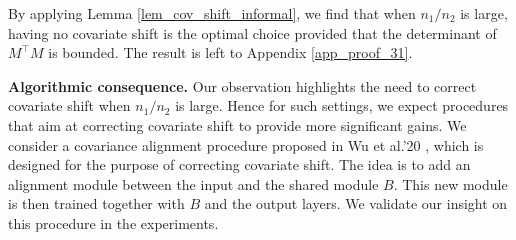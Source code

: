 By applying Lemma \ref{lem_cov_shift_informal}, we find that when $n_1 / n_2$ is large, having no covariate shift is the optimal choice provided that the determinant of $M^{\top}M$ is bounded.
The result is left to Appendix \ref{app_proof_31}.


\textbf{Algorithmic consequence.}
Our observation highlights the need to correct covariate shift when $n_1 / n_2$ is large.
Hence for such settings, we expect procedures that aim at correcting covariate shift to provide more significant gains.
We consider a covariance alignment procedure proposed in Wu et al.'20 \cite{WZR20}, which is designed for the purpose of correcting covariate shift.
The idea is to add an alignment module between the input and the shared module $B$.
This new module is then trained together with $B$ and the output layers.
We validate our insight on this procedure in the experiments.